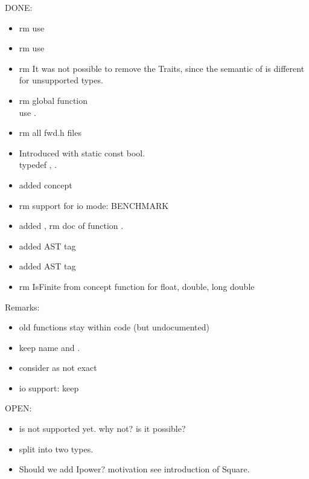 DONE:

\begin{itemize}
\item rm  use 
\item rm  use 
\item rm  It was not possible to remove the Traits, since  
      the semantic of  is different for unsupported types.
\item rm global function \\
      use .
\item rm all fwd.h files    
\item Introduced  with static const bool. \\
      typedef , . 
\item added concept 
\item rm support for io mode: BENCHMARK 
\item added , rm doc of function .
\item added AST tag 
\item added AST tag 
\item rm IsFinite from  concept
      function  for float, double, long double 
\end{itemize}

Remarks:
\begin{itemize}
\item old functions stay within code (but undocumented)
\item keep name  and .
\item consider  as not exact
\item io support: keep  
\end{itemize}

OPEN:
\begin{itemize}
\item {} is not supported yet. why not? is it possible?  
\item split  into two types. 
\item Should we add Ipower? motivation see introduction of Square. 
\end{itemize}

